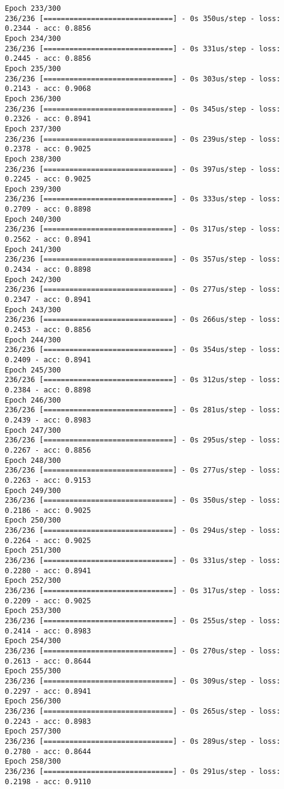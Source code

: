 \documentclass[11pt]{article}
\begin{document}
\begin{Verbatim}[commandchars=\\\{\}]
Epoch 233/300
236/236 [==============================] - 0s 350us/step - loss: 0.2344 - acc: 0.8856
Epoch 234/300
236/236 [==============================] - 0s 331us/step - loss: 0.2445 - acc: 0.8856
Epoch 235/300
236/236 [==============================] - 0s 303us/step - loss: 0.2143 - acc: 0.9068
Epoch 236/300
236/236 [==============================] - 0s 345us/step - loss: 0.2326 - acc: 0.8941
Epoch 237/300
236/236 [==============================] - 0s 239us/step - loss: 0.2378 - acc: 0.9025
Epoch 238/300
236/236 [==============================] - 0s 397us/step - loss: 0.2245 - acc: 0.9025
Epoch 239/300
236/236 [==============================] - 0s 333us/step - loss: 0.2709 - acc: 0.8898
Epoch 240/300
236/236 [==============================] - 0s 317us/step - loss: 0.2562 - acc: 0.8941
Epoch 241/300
236/236 [==============================] - 0s 357us/step - loss: 0.2434 - acc: 0.8898
Epoch 242/300
236/236 [==============================] - 0s 277us/step - loss: 0.2347 - acc: 0.8941
Epoch 243/300
236/236 [==============================] - 0s 266us/step - loss: 0.2453 - acc: 0.8856
Epoch 244/300
236/236 [==============================] - 0s 354us/step - loss: 0.2409 - acc: 0.8941
Epoch 245/300
236/236 [==============================] - 0s 312us/step - loss: 0.2384 - acc: 0.8898
Epoch 246/300
236/236 [==============================] - 0s 281us/step - loss: 0.2439 - acc: 0.8983
Epoch 247/300
236/236 [==============================] - 0s 295us/step - loss: 0.2267 - acc: 0.8856
Epoch 248/300
236/236 [==============================] - 0s 277us/step - loss: 0.2263 - acc: 0.9153
Epoch 249/300
236/236 [==============================] - 0s 350us/step - loss: 0.2186 - acc: 0.9025
Epoch 250/300
236/236 [==============================] - 0s 294us/step - loss: 0.2264 - acc: 0.9025
Epoch 251/300
236/236 [==============================] - 0s 331us/step - loss: 0.2280 - acc: 0.8941
Epoch 252/300
236/236 [==============================] - 0s 317us/step - loss: 0.2209 - acc: 0.9025
Epoch 253/300
236/236 [==============================] - 0s 255us/step - loss: 0.2414 - acc: 0.8983
Epoch 254/300
236/236 [==============================] - 0s 270us/step - loss: 0.2613 - acc: 0.8644
Epoch 255/300
236/236 [==============================] - 0s 309us/step - loss: 0.2297 - acc: 0.8941
Epoch 256/300
236/236 [==============================] - 0s 265us/step - loss: 0.2243 - acc: 0.8983
Epoch 257/300
236/236 [==============================] - 0s 289us/step - loss: 0.2780 - acc: 0.8644
Epoch 258/300
236/236 [==============================] - 0s 291us/step - loss: 0.2198 - acc: 0.9110

\end{Verbatim}
\end{document}
